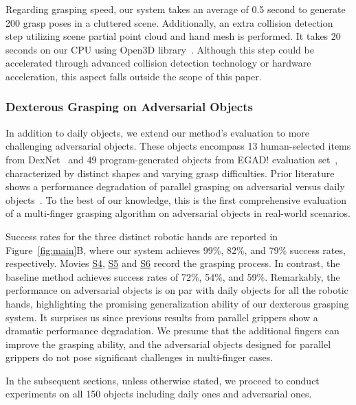 Regarding grasping speed, our system takes an average of 0.5 second to generate 200 grasp poses in a cluttered scene. Additionally, an extra collision detection step utilizing scene partial point cloud and hand mesh is performed. It takes 20 seconds on our CPU using Open3D library~\cite{Zhou2018}. Although this step could be accelerated through advanced collision detection technology or hardware acceleration, this aspect falls outside the scope of this paper.

\subsubsection*{Dexterous Grasping on Adversarial Objects}

In addition to daily objects, we extend our method’s evaluation to more challenging adversarial objects. These objects encompass 13 human-selected items from DexNet~\cite{dexnet2} and 49 program-generated objects from EGAD! evaluation set~\cite{morrison2020egad}, characterized by distinct shapes and varying grasp difficulties. Prior literature shows a performance degradation of parallel grasping on adversarial versus daily objects~\cite{fang2023anygrasp}. To the best of our knowledge, this is the first comprehensive evaluation of a multi-finger grasping algorithm on adversarial objects in real-world scenarios.

Success rates for the three distinct robotic hands are reported in Figure~\ref{fig:main}B, where our system achieves 99\%, 82\%, and 79\% success rates, respectively. Movies \hyperlink{movie_s4}{S4}, \hyperlink{movie_s5}{S5} and \hyperlink{movie_s6}{S6} record the grasping process.  In contrast, the baseline method achieves success rates of 72\%, 54\%, and 59\%. Remarkably, the performance on adversarial objects is on par with daily objects for all the robotic hands, highlighting the promising generalization ability of our dexterous grasping system. It surprises us since previous results from parallel grippers show a dramatic performance degradation. We presume that the additional fingers can improve the grasping ability, and the adversarial objects designed for parallel grippers do not pose significant challenges in multi-finger cases. 

In the subsequent sections, unless otherwise stated, we proceed to conduct experiments on all 150 objects including daily ones and adversarial ones.

